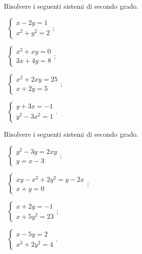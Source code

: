 \begin{esercizio}[\Ast]
 \label{ese:6.2}
Risolvere i seguenti sistemi di secondo grado.
\begin{multicols}{2}
 \begin{enumeratea}
 \item~$\left\{\begin{array}{l}x-2y=1\\x^{2}+y^{2}=2\end{array}\right.$;
 \item~$\left\{\begin{array}{l}x^2+xy=0\\3x+4y=8\end{array}\right.$;
 \item~$\left\{\begin{array}{l}x^2+2xy=25\\x+2y=5\end{array}\right.$;
 \item~$\left\{\begin{array}{l}y+3x=-1\\y^{2}-3x^{2}=1\end{array}\right.$.
 \end{enumeratea}
 \end{multicols}
\end{esercizio}

\begin{esercizio}[\Ast]
\label{ese:6.3}
Risolvere i seguenti sistemi di secondo grado.
\begin{multicols}{2}
 \begin{enumeratea}
 \item~$\left\{\begin{array}{l}y^2-3y=2xy\\y=x-3\end{array}\right.$;
 \item~$\left\{\begin{array}{l}xy-x^2+2y^2=y-2x\\x+y=0\end{array}\right.$;
 \item~$\left\{\begin{array}{l}{x+2y=-1}\\{x+5y^2=23}\end{array}\right.$;
 \item~$\left\{\begin{array}{l}{x-5y=2}\\{x^2+2y^2=4}\end{array}\right.$.
 \end{enumeratea}
 \end{multicols}
\end{esercizio}

